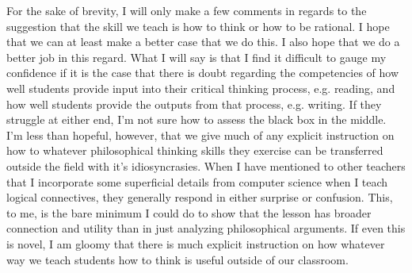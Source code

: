 \documentclass[letterpaper,notitlepage,12pt]{article}
\begin{document}
For the sake of brevity, I will only make a few comments in regards to the
suggestion that the skill we teach is how to think or how to be rational.
I hope that we can at least make a better case that we do this.
I also hope that we do a better job in this regard.
What I will say is that I find it difficult to gauge my confidence if it is the
case that there is doubt regarding the competencies of how well students provide
input into their critical thinking process, e.g. reading, and how well students
provide the outputs from that process, e.g. writing.
If they struggle at either end, I'm not sure how to assess the black box in the
middle.
I'm less than hopeful, however, that we give much of any explicit instruction on
how to whatever philosophical thinking skills they exercise can be transferred
outside the field with it's idiosyncrasies.
When I have mentioned to other teachers that I incorporate some superficial
details from computer science when I teach logical connectives, they generally
respond in either surprise or confusion.
This, to me, is the bare minimum I could do to show that the lesson has broader
connection and utility than in just analyzing philosophical arguments.
If even this is novel, I am gloomy that there is much explicit instruction on
how whatever way we teach students how to think is useful outside of our
classroom.
\end{document}
